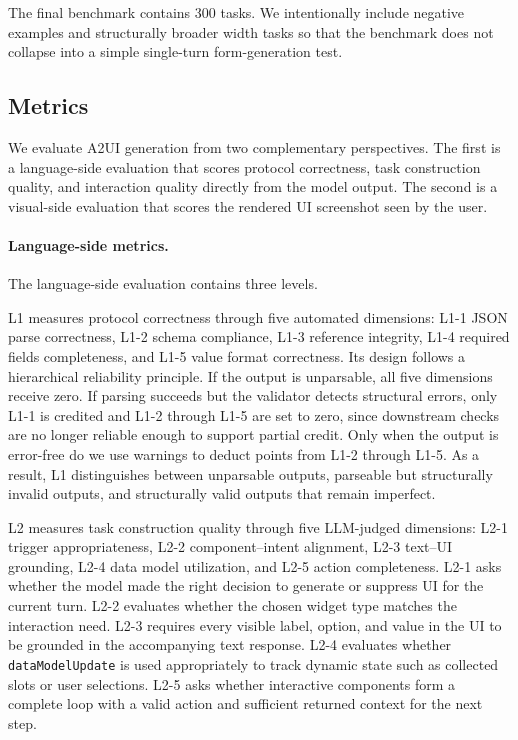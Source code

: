 \documentclass{llmxive}
\begin{document}
The final benchmark contains 300 tasks. We intentionally include negative examples and structurally broader width tasks so that the benchmark does not collapse into a simple single-turn form-generation test.

\subsection{Metrics}
\label{subsec:metrics}

We evaluate A2UI generation from two complementary perspectives. The first is a language-side evaluation that scores protocol correctness, task construction quality, and interaction quality directly from the model output. The second is a visual-side evaluation that scores the rendered UI screenshot seen by the user.

\paragraph{Language-side metrics.}
The language-side evaluation contains three levels.

L1 measures protocol correctness through five automated dimensions: L1-1 JSON parse correctness, L1-2 schema compliance, L1-3 reference integrity, L1-4 required fields completeness, and L1-5 value format correctness. Its design follows a hierarchical reliability principle. If the output is unparsable, all five dimensions receive zero. If parsing succeeds but the validator detects structural errors, only L1-1 is credited and L1-2 through L1-5 are set to zero, since downstream checks are no longer reliable enough to support partial credit. Only when the output is error-free do we use warnings to deduct points from L1-2 through L1-5. As a result, L1 distinguishes between unparsable outputs, parseable but structurally invalid outputs, and structurally valid outputs that remain imperfect.

L2 measures task construction quality through five LLM-judged dimensions: L2-1 trigger appropriateness, L2-2 component--intent alignment, L2-3 text--UI grounding, L2-4 data model utilization, and L2-5 action completeness. L2-1 asks whether the model made the right decision to generate or suppress UI for the current turn. L2-2 evaluates whether the chosen widget type matches the interaction need. L2-3 requires every visible label, option, and value in the UI to be grounded in the accompanying text response. L2-4 evaluates whether \texttt{dataModelUpdate} is used appropriately to track dynamic state such as collected slots or user selections. L2-5 asks whether interactive components form a complete loop with a valid action and sufficient returned context for the next step.
\end{document}
